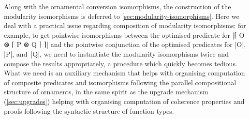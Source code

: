 
Along with the ornamental conversion isomorphisms, the construction of the modularity isomorphisms is deferred to \autoref{sec:modularity-isomorphisms}.
Here we deal with a practical issue regarding composition of modularity isomorphisms:
for example, to get pointwise isomorphisms between the optimised predicate for |⌈ O ⊗ ⌈ P ⊗ Q ⌉ ⌉| and the pointwise conjunction of the optimised predicates for |O|, |P|, and~|Q|, we need to instantiate the modularity isomorphisms twice and compose the results appropriately, a procedure which quickly becomes tedious.
What we need is an auxiliary mechanism that helps with organising computation of composite predicates and isomorphisms following the parallel compositional structure of ornaments, in the same spirit as the upgrade mechanism (\autoref{sec:upgrades}) helping with organising computation of coherence properties and proofs following the syntactic structure of function types.

